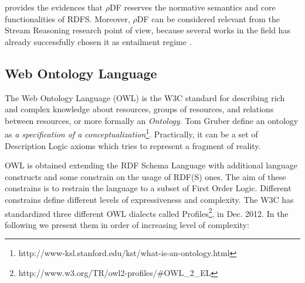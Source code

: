 \cite{DBLP:conf/esws/MunozPG07} provides the evidences that $\rho$DF reserves the normative semantics and core functionalities of RDFS. Moreover,  $\rho$DF can be considered relevant from  the Stream Reasoning research point of view, because several works in the field  has already successfully chosen it as entailment regime \cite{DBLP:conf/semweb/UrbaniMJHB13, Liu:2014:ERS:2567948.2577323}.

\subsection{Web Ontology Language}\label{sec:owl}

The Web Ontology Language (OWL) is the W3C standard for describing rich and complex knowledge about resources, groups of resources, and relations between resources, or more formally an \textit{Ontology}. Tom Gruber define an ontology as \textit{a specification of a conceptualization}\footnote{http://www-ksl.stanford.edu/kst/what-is-an-ontology.html}. Practically, it can be a set of Description Logic axioms which tries to represent a fragment of reality. 

OWL is obtained extending the RDF Schema Language with additional language constructs and some constrain on the usage of RDF(S)  ones. The aim of these constrains is to restrain the language to a subset of First Order Logic. Different constrains define different levels of expressiveness and complexity. The W3C has standardized three different OWL dialects called Profiles\footnote{http://www.w3.org/TR/owl2-profiles/\#OWL\_2\_EL}, in Dec. 2012. In the following we present them in order of increasing level of complexity:

